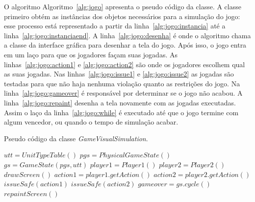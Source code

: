 
O algoritmo Algoritmo~\ref{alg:jogo} apresenta o pseudo código da classe.  
A classe primeiro obtém as instâncias dos objetos necessários para a simulação do jogo: esse processo está representado a partir da linha~\ref{alg:jogo:instancia} até a linha~\ref{alg:jogo:instanciaend}.
A linha~\ref{alg:jogo:desenha} é onde o algoritmo chama a classe da interface gráfica para desenhar a tela do jogo.
Após isso, o jogo entra em um laço para que os jogadores façam suas jogadas. As linhas~\ref{alg:jogo:action1} e \ref{alg:jogo:action2} são onde os jogadores escolhem qual as suas jogadas.
Nas linhas~\ref{alg:jogo:issue1} e \ref{alg:jogo:issue2} as jogadas são testadas para que não haja nenhuma violação quanto as restrições do jogo.
Na linha~\ref{alg:jogo:gameover} é responsável por determinar se o jogo não acabou.
A linha~\ref{alg:jogo:repaint} desenha a tela novamente com as jogadas executadas.
Assim o laço da linha~\ref{alg:jogo:while} é executado até que o jogo termine com algum vencedor, ou quando o tempo de simulação acabar.

\begin{algorithm}
	\caption{Pseudo código da classe \textit{GameVisualSimulation}.}
	\label{alg:jogo}
	\begin{algorithmic}[1]		
		\State $utt = UnitTypeTable()$ \label{alg:jogo:instancia}
		\State $pgs = PhysicalGameState()$
		\State $gs = GameState(pgs, utt)$
		\State $player1 = Player1()$
		\State $player2 = Player2()$ \label{alg:jogo:instanciaend}
		\State $drawScreen()$  \label{alg:jogo:desenha}
		 \label{alg:jogo:while}
			\State $action1 = player1.getAction()$ \label{alg:jogo:action1}
			\State $action2 = player2.getAction()$ \label{alg:jogo:action2}
			\State $issueSafe(action1)$ \label{alg:jogo:issue1}
			\State $issueSafe(action2)$ \label{alg:jogo:issue2}
			\State $gameover = gs.cycle()$ \label{alg:jogo:gameover} 
			\State $repaintScreen()$ \label{alg:jogo:repaint}
		\EndWhile
		\EndFunction
	\end{algorithmic}
\end{algorithm}

